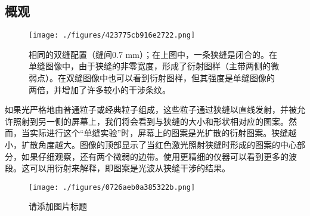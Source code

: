 \subsection{概观}
\begin{figure}[ht]
\centering
\texttt{[image: ./figures/423775cb916e2722.png]}
\caption{相同的双缝配置（缝间0.7 mm）；在上图中，一条狭缝是闭合的。在单缝图像中，由于狭缝的非零宽度，形成了衍射图样（主带两侧的微弱点）。在双缝图像中也可以看到衍射图样，但其强度是单缝图像的两倍，并增加了许多较小的干涉条纹。} \label{fig_SFSY_1}
\end{figure}
如果光严格地由普通粒子或经典粒子组成，这些粒子通过狭缝以直线发射，并被允许照射到另一侧的屏幕上，我们将会看到与狭缝的大小和形状相对应的图案。然而，当实际进行这个“单缝实验”时，屏幕上的图案是光扩散的衍射图案。狭缝越小，扩散角度越大。图像的顶部显示了当红色激光照射狭缝时形成的图案的中心部分，如果仔细观察，还有两个微弱的边带。使用更精细的仪器可以看到更多的波段。这可以用衍射来解释，即图案是光波从狭缝干涉的结果。
\begin{figure}[ht]
\centering
\texttt{[image: ./figures/0726aeb0a385322b.png]}
\caption{请添加图片标题} \label{fig_SFSY_2}
\end{figure}
